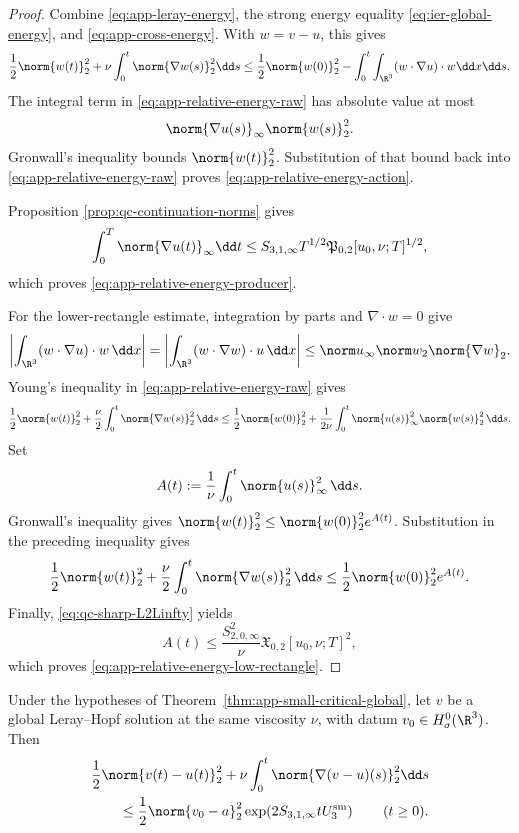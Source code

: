 \begin{proof}
Combine \eqref{eq:app-leray-energy}, the strong energy equality
\eqref{eq:ier-global-energy}, and \eqref{eq:app-cross-energy}.  With
\(w=v-u\), this gives
\begin{equation}
 \frac12\norm{w(t)}_2^2
 +\nu\int_0^t\norm{\nabla w(s)}_2^2\dd s
 \le
 \frac12\norm{w(0)}_2^2
 -\int_0^t\int_{\R^3}(w\cdot\nabla u)\cdot w\dd x\dd s.
 \label{eq:app-relative-energy-raw}
\end{equation}
The integral term in \eqref{eq:app-relative-energy-raw} has absolute value at
most
\[
 \norm{\nabla u(s)}_\infty\norm{w(s)}_2^2.
\]
Gronwall's inequality bounds \(\norm{w(t)}_2^2\).  Substitution of that
bound back into \eqref{eq:app-relative-energy-raw} proves
\eqref{eq:app-relative-energy-action}.
\begin{samepage}
Proposition
\ref{prop:qc-continuation-norms} gives
\[
 \int_0^T\norm{\nabla u(t)}_\infty\dd t
 \le
 S_{3,1,\infty}T^{1/2}
 \mathfrak P_{0,2}[u_0,\nu;T]^{1/2},
\]
which proves \eqref{eq:app-relative-energy-producer}.
\end{samepage}

For the lower-rectangle estimate, integration by parts and
\(\nabla\cdot w=0\) give
\[
 \left|\int_{\R^3}(w\cdot\nabla u)\cdot w\,\dd x\right|
 =\left|\int_{\R^3}(w\cdot\nabla w)\cdot u\,\dd x\right|
 \le\norm u_\infty\norm w_2\norm{\nabla w}_2.
\]
Young's inequality in \eqref{eq:app-relative-energy-raw} gives
\begin{align*}
 \frac12\norm{w(t)}_2^2
 +\frac\nu2\int_0^t\norm{\nabla w(s)}_2^2\,\dd s
 \le\frac12\norm{w(0)}_2^2
 +\frac1{2\nu}\int_0^t\norm{u(s)}_\infty^2
 \norm{w(s)}_2^2\,\dd s.
\end{align*}
Set
\[
 A(t):=\frac1\nu\int_0^t\norm{u(s)}_\infty^2\,\dd s.
\]
Gronwall's inequality gives
\(\norm{w(t)}_2^2\le\norm{w(0)}_2^2e^{A(t)}\).  Substitution in the
preceding inequality gives
\[
 \frac12\norm{w(t)}_2^2
 +\frac\nu2\int_0^t\norm{\nabla w(s)}_2^2\,\dd s
 \le\frac12\norm{w(0)}_2^2e^{A(t)}.
\]
Finally, \eqref{eq:qc-sharp-L2Linfty} yields
\[
 A(t)\le\frac{S_{2,0,\infty}^2}{\nu}
 \mathfrak X_{0,2}[u_0,\nu;T]^2,
\]
which proves \eqref{eq:app-relative-energy-low-rectangle}.
\end{proof}

\begin{corollary}
\label{cor:app-small-weak-stability}
Under the hypotheses of Theorem~\ref{thm:app-small-critical-global}, let
\(v\) be a global Leray--Hopf solution at the same viscosity \(\nu\), with
datum \(v_0\in H^0_\sigma(\R^3)\).
Then
\begin{align}
 &\frac12\norm{v(t)-u(t)}_2^2
 +\nu\int_0^t\norm{\nabla(v-u)(s)}_2^2\dd s
 \notag\\
 &\qquad\le
 \frac12\norm{v_0-a}_2^2
 \exp\!\left(2S_{3,1,\infty}tU_3^{\rm sm}\right)
 \qquad(t\ge0).
 \label{eq:app-small-weak-stability}
\end{align}
\end{corollary}

